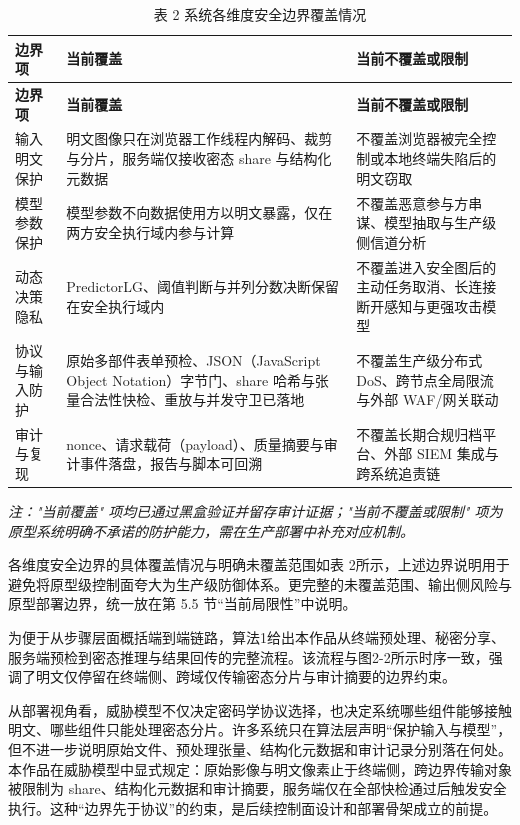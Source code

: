 \begin{longtable}{>{\raggedright\arraybackslash}p{}>{\raggedright\arraybackslash}p{}>{\raggedright\arraybackslash}p{}}
\caption{表 2 系统各维度安全边界覆盖情况}\\
\toprule
\textbf{边界项} & \textbf{当前覆盖} & \textbf{当前不覆盖或限制} \\
\midrule
\endfirsthead
\toprule
\textbf{边界项} & \textbf{当前覆盖} & \textbf{当前不覆盖或限制} \\
\midrule
\endhead
输入明文保护 & 明文图像只在浏览器工作线程内解码、裁剪与分片，服务端仅接收密态 share 与结构化元数据 & 不覆盖浏览器被完全控制或本地终端失陷后的明文窃取 \\
模型参数保护 & 模型参数不向数据使用方以明文暴露，仅在两方安全执行域内参与计算 & 不覆盖恶意参与方串谋、模型抽取与生产级侧信道分析 \\
动态决策隐私 & PredictorLG、阈值判断与并列分数决断保留在安全执行域内 & 不覆盖进入安全图后的主动任务取消、长连接断开感知与更强攻击模型 \\
协议与输入防护 & 原始多部件表单预检、JSON（JavaScript Object Notation）字节门、share 哈希与张量合法性快检、重放与并发守卫已落地 & 不覆盖生产级分布式 DoS、跨节点全局限流与外部 WAF/网关联动 \\
审计与复现 & nonce、请求载荷（payload）、质量摘要与审计事件落盘，报告与脚本可回溯 & 不覆盖长期合规归档平台、外部 SIEM 集成与跨系统追责链 \\
\bottomrule
\end{longtable}

\noindent\textit{注："当前覆盖" 项均已通过黑盒验证并留存审计证据；"当前不覆盖或限制" 项为原型系统明确不承诺的防护能力，需在生产部署中补充对应机制。}

各维度安全边界的具体覆盖情况与明确未覆盖范围如表 2所示，上述边界说明用于避免将原型级控制面夸大为生产级防御体系。更完整的未覆盖范围、输出侧风险与原型部署边界，统一放在第 5.5 节“当前局限性”中说明。

为便于从步骤层面概括端到端链路，算法1给出本作品从终端预处理、秘密分享、服务端预检到密态推理与结果回传的完整流程。该流程与图2-2所示时序一致，强调了明文仅停留在终端侧、跨域仅传输密态分片与审计摘要的边界约束。

从部署视角看，威胁模型不仅决定密码学协议选择，也决定系统哪些组件能够接触明文、哪些组件只能处理密态分片。许多系统只在算法层声明“保护输入与模型”，但不进一步说明原始文件、预处理张量、结构化元数据和审计记录分别落在何处。本作品在威胁模型中显式规定：原始影像与明文像素止于终端侧，跨边界传输对象被限制为 share、结构化元数据和审计摘要，服务端仅在全部快检通过后触发安全执行。这种“边界先于协议”的约束，是后续控制面设计和部署骨架成立的前提。

